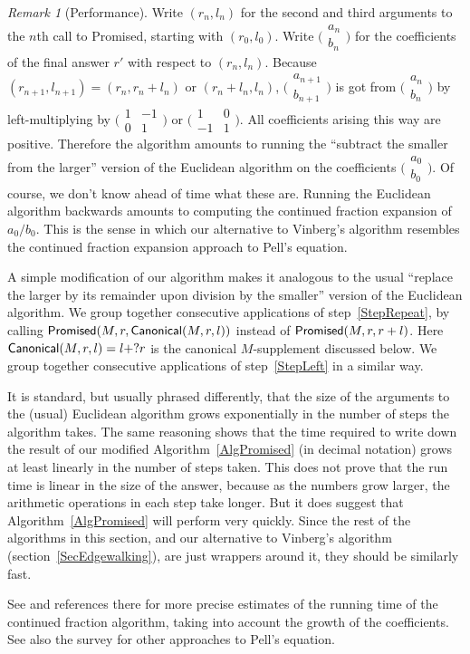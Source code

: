 \documentclass[12pt]{amsart}
\def\twobyone#1#2{\bigl(\begin{smallmatrix}#1\\#2\end{smallmatrix}\bigr)
    }
\def\twobytwo#1#2#3#4{\bigl(\begin{smallmatrix}#1&#2\\#3&#4\end{smallmatrix}\bigr)
    }
\numberwithin{theorem}{section}
\numberwithin{equation}{section}
\numberwithin{figure}{section}
\theoremstyle{remark}
\newtheorem{remark}[theorem]{Remark}
\begin{document}
\begin{remark}[Performance]
    \label{RkPerformance}
    Write $(r_n,l_n)$ for the second and third arguments to the
    $n$th call to
    {\sf Promised}, starting with $(r_0,l_0)$.  Write $\twobyone{a_n}{b_n}$
    for the coefficients of the final answer $r'$ with respect
    to $(r_n,l_n)$.  Because
    $(r_{n+1},l_{n+1})=(r_n,r_n+l_n)$ or
    $(r_n+l_n,l_n)$,  $\twobyone{a_{n+1}}{b_{n+1}}$ 
    is got from $\twobyone{a_n}{b_n}$ by 
left-multiplying by 
     $\twobytwo{1}{-1}{0}{1}$ or $\twobytwo10{-1}1$.
    All coefficients arising this way are positive.
    Therefore the algorithm amounts to running the 
    ``subtract the smaller from the larger'' version of the
    Euclidean algorithm
    on the coefficients $\twobyone{a_0}{b_0}$.
    Of course, we don't know
    ahead of time what these are.  Running the Euclidean algorithm
    backwards  amounts to computing the continued fraction
    expansion of $a_0/b_0$.   %
    This is the sense in which
    our alternative
    to Vinberg's algorithm resembles the continued fraction expansion
    approach to Pell's equation.

    A simple modification of our algorithm makes it analogous
    to the usual ``replace the larger by its remainder upon division
    by the smaller'' version of the Euclidean algorithm.
    We group together consecutive applications of step~\ref{StepRepeat}, by
     calling ${\sf Promised}(M,r,{\sf Canonical}(M,r,l))$
    instead of ${\sf Promised}(M,r,r+l)$. Here
    ${\sf Canonical}(M,r,l)=l+?r$ is the canonical $M$-supplement
    discussed below.  We group together consecutive applications
    of step~\ref{StepLeft} in a similar way.

    It is standard, but usually phrased differently,
    that the size of the arguments to
    the (usual) Euclidean algorithm grows exponentially in the number of
    steps the algorithm takes.  
    The same reasoning shows that the time required to write down 
    the result of our modified Algorithm~\ref{AlgPromised} (in 
    decimal notation) grows at least linearly in  
    the number of steps taken.
    This does not prove that the
    run time is linear in the size of the answer,
    because as the numbers grow larger, the arithmetic operations 
    in each step take longer.  But it does suggest that
    Algorithm~\ref{AlgPromised} will perform very quickly.  Since the
    rest of the algorithms in this section, and our alternative
    to Vinberg's algorithm (section~\ref{SecEdgewalking}), are just wrappers
    around it, they should be similarly fast.

    See
    \cite[\S5.7.1--5.7.2]{Cohen} and references there 
    for more precise estimates of the running time
    of the continued fraction algorithm, taking into account the growth
    of the coefficients.  See also the survey \cite{Lenstra} for 
    other approaches to Pell's equation.
\end{remark}
\end{document}
